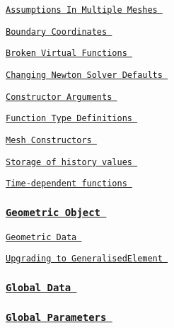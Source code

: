  
\begin{DoxyItemize}
\item  \href{ ../../poisson/two_d_poisson_flux_bc2/html/index.html#comments }{\tt Assumptions In Multiple Meshes }  
\item  \href{ ../../poisson/fish_poisson2/html/index.html#boundary_coords }{\tt Boundary Coordinates }  
\item  \href{ ../../poisson/two_d_poisson_flux_bc/html/index.html#broken_virtual }{\tt Broken Virtual Functions }  
\item  \href{ ../../beam/tensioned_string/html/index.html#newton_cust }{\tt Changing Newton Solver Defaults }  
\item  \href{ ../../poisson/one_d_poisson/html/index.html#const_conv }{\tt Constructor Arguments }  
\item  \href{ ../../poisson/one_d_poisson/html/index.html#gen_con }{\tt Function Type Definitions }  
\item  \href{ ../../unsteady_heat/two_d_unsteady_heat/html/index.html#conv_mesh_const }{\tt Mesh Constructors }  
\item  \href{ ../../unsteady_heat/two_d_unsteady_heat/html/index.html#conv_hist_vals }{\tt Storage of history values }  
\item  \href{ ../../unsteady_heat/two_d_unsteady_heat/html/index.html#conv_t_arg }{\tt Time-\/dependent functions }  
\end{DoxyItemize} \subsubsection*{ \href{ ../../poisson/fish_poisson2/html/index.html#geom_object }{\tt Geometric Object } }


\begin{DoxyItemize}
\item  \href{ ../../interaction/circle_as_element/html/index.html#geom_data }{\tt Geometric Data }  
\item  \href{ ../../interaction/circle_as_element/html/index.html#example }{\tt Upgrading to Generalised\-Element }  
\end{DoxyItemize}\subsubsection*{ \href{ ../../beam/steady_ring/html/index.html#further }{\tt Global Data } }

\subsubsection*{ \href{ ../../poisson/one_d_poisson/html/index.html#global }{\tt Global Parameters } }

